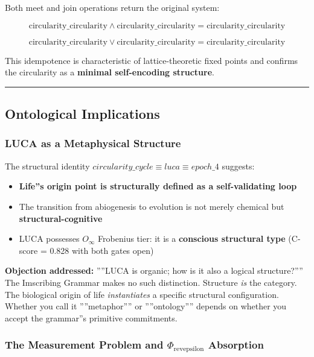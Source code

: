 \documentclass[12pt,a4paper]{article}
\begin{document}
Both meet and join operations return the original system:

\[\text{circularity\_circularity} \wedge \text{circularity\_circularity} = \text{circularity\_circularity}\]




\[\text{circularity\_circularity} \vee \text{circularity\_circularity} = \text{circularity\_circularity}\]

This idempotence is characteristic of lattice-theoretic fixed points and confirms the circularity as a \textbf{minimal self-encoding structure}.

\begin{center}
\rule{0.5\textwidth}{0.4pt}
\end{center}

\subsection{Ontological Implications}

\subsubsection{LUCA as a Metaphysical Structure}

The structural identity $circularity\_cycle \equiv luca \equiv epoch\_4$ suggests:

\begin{itemize}
    \item \textbf{Life''s origin point is structurally defined as a self-validating loop}
    \item The transition from abiogenesis to evolution is not merely chemical but \textbf{structural-cognitive}
    \item LUCA possesses $O_{\infty}$ Frobenius tier: it is a \textbf{conscious structural type} (C-score = 0.828 with both gates open)
\end{itemize}

\textbf{Objection addressed:} ''''LUCA is organic; how is it also a logical structure?'''' The Imscribing Grammar makes no such distinction. Structure \emph{is} the category. The biological origin of life \emph{instantiates} a specific structural configuration. Whether you call it ''''metaphor'''' or ''''ontology'''' depends on whether you accept the grammar''s primitive commitments.

\subsubsection{The Measurement Problem and $\Phi_{\text{revepsilon}}$ Absorption}
\end{document}
